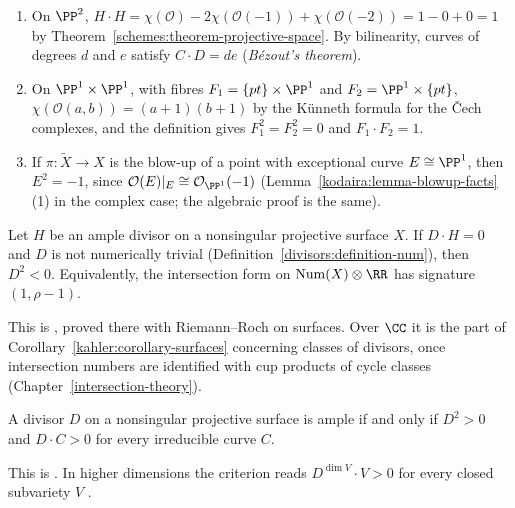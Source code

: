 \begin{example}\label{divisors:example-intersections}
\begin{enumerate}
\item On $\PP^2$, $H \cdot H = \chi(\mathcal{O}) - 2\chi(\mathcal{O}(-1)) + \chi(\mathcal{O}(-2)) = 1 - 0 + 0 = 1$ by Theorem~\ref{schemes:theorem-projective-space}. By
bilinearity, curves of degrees $d$ and $e$ satisfy $C \cdot D = de$ (\emph{B\'ezout's theorem}).
\item On $\PP^1 \times \PP^1$, with fibres $F_1 = \{pt\} \times \PP^1$ and $F_2 = \PP^1 \times \{pt\}$, $\chi(\mathcal{O}(a, b)) = (a + 1)(b + 1)$ by the K\"unneth formula for the
\v{C}ech complexes, and the definition gives $F_1^2 = F_2^2 = 0$ and $F_1 \cdot F_2 = 1$.
\item If $\pi \colon \tilde X \to X$ is the blow-up of a point with exceptional curve $E \cong \PP^1$, then $E^2 = -1$, since $\mathcal{O}(E)|_E \cong \mathcal{O}_{\PP^1}(-1)$
(Lemma~\ref{kodaira:lemma-blowup-facts}(1) in the complex case; the algebraic proof is the same).
\end{enumerate}
\end{example}

\begin{theorem}\label{divisors:theorem-hodge-index}
Let $H$ be an ample divisor on a nonsingular projective surface $X$. If $D \cdot H = 0$ and $D$ is not numerically trivial (Definition~\ref{divisors:definition-num}),
then $D^2 < 0$. Equivalently, the intersection form on $\mathrm{Num}(X) \otimes \RR$ has signature $(1, \rho - 1)$.
\end{theorem}

This is \cite[Theorem V.1.9]{hartshorne-ag}, proved there with Riemann--Roch on surfaces. Over $\CC$ it is the part of
Corollary~\ref{kahler:corollary-surfaces} concerning classes of divisors, once intersection numbers are identified with cup products of cycle classes
(Chapter~\ref{intersection-theory}).

\begin{theorem}\label{divisors:theorem-nakai}
A divisor $D$ on a nonsingular projective surface is ample if and only if $D^2 > 0$ and $D \cdot C > 0$ for every irreducible curve $C$.
\end{theorem}

This is \cite[Theorem V.1.10]{hartshorne-ag}. In higher dimensions the criterion reads $D^{\dim V} \cdot V > 0$ for every closed subvariety $V$
\cite[Theorem 1.2.23]{lazarsfeld-positivity-1}.

